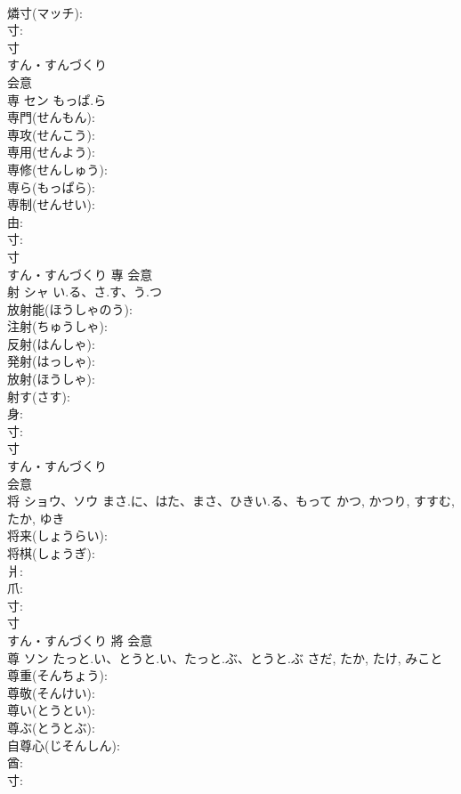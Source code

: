 \documentclass[8pt]{extreport}
\begin{document}
\begin{CJK}{UTF8}{min}
\\	燐寸(マッチ): 
\\	寸: 
\\	寸	
\\	すん・すんづくり	
\\	会意 
\\	専	セン	もっぱ.ら		
\\	専門(せんもん): 
\\	専攻(せんこう): 
\\	専用(せんよう): 
\\	専修(せんしゅう): 
\\	専ら(もっぱら): 
\\	専制(せんせい): 
\\	由: 
\\	寸: 
\\	寸	
\\	すん・すんづくり	專	会意 
\\	射	シャ	い.る、さ.す、う.つ		
\\	放射能(ほうしゃのう): 
\\	注射(ちゅうしゃ): 
\\	反射(はんしゃ): 
\\	発射(はっしゃ): 
\\	放射(ほうしゃ): 
\\	射す(さす): 
\\	身: 
\\	寸: 
\\	寸	
\\	すん・すんづくり	
\\	会意 
\\	将	ショウ、ソウ	まさ.に、はた、まさ、ひきい.る、もって	かつ, かつり, すすむ, たか, ゆき	
\\	将来(しょうらい): 
\\	将棋(しょうぎ): 
\\	爿: 
\\	爪: 
\\	寸: 
\\	寸	
\\	すん・すんづくり	將	会意 
\\	尊	ソン	たっと.い、とうと.い、たっと.ぶ、とうと.ぶ	さだ, たか, たけ, みこと	
\\	尊重(そんちょう): 
\\	尊敬(そんけい): 
\\	尊い(とうとい): 
\\	尊ぶ(とうとぶ): 
\\	自尊心(じそんしん): 
\\	酋: 
\\	寸: 

\end{CJK}
\end{document}
